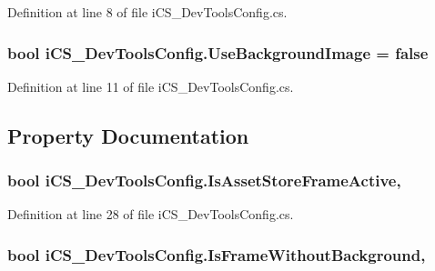 Definition at line 8 of file i\+C\+S\+\_\+\+Dev\+Tools\+Config.\+cs.

\hypertarget{classi_c_s___dev_tools_config_aadfbbdb943668a31252fcfe7a15b9890}{
\subsubsection[{Use\+Background\+Image}]{\setlength{\rightskip}{0pt plus 5cm}bool i\+C\+S\+\_\+\+Dev\+Tools\+Config.\+Use\+Background\+Image = false\hspace{0.3cm}{\ttfamily [static]}}}\label{classi_c_s___dev_tools_config_aadfbbdb943668a31252fcfe7a15b9890}


Definition at line 11 of file i\+C\+S\+\_\+\+Dev\+Tools\+Config.\+cs.



\subsection{Property Documentation}
\hypertarget{classi_c_s___dev_tools_config_a6d3a3b5fcfc49ad984d170f9c42d2c64}{
\subsubsection[{Is\+Asset\+Store\+Frame\+Active}]{\setlength{\rightskip}{0pt plus 5cm}bool i\+C\+S\+\_\+\+Dev\+Tools\+Config.\+Is\+Asset\+Store\+Frame\+Active\hspace{0.3cm}{\ttfamily [static]}, {\ttfamily [get]}}}\label{classi_c_s___dev_tools_config_a6d3a3b5fcfc49ad984d170f9c42d2c64}


Definition at line 28 of file i\+C\+S\+\_\+\+Dev\+Tools\+Config.\+cs.

\hypertarget{classi_c_s___dev_tools_config_a1bf7ed6d7bbe1cf6fa42f58b7f1e94a5}{
\subsubsection[{Is\+Frame\+Without\+Background}]{\setlength{\rightskip}{0pt plus 5cm}bool i\+C\+S\+\_\+\+Dev\+Tools\+Config.\+Is\+Frame\+Without\+Background\hspace{0.3cm}{\ttfamily [static]}, {\ttfamily [get]}}}\label{classi_c_s___dev_tools_config_a1bf7ed6d7bbe1cf6fa42f58b7f1e94a5}



